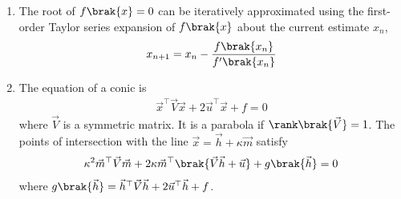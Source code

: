 \begin{enumerate}[label=\thesubsection.\arabic*, ref=\thesubsection.\theenumi]
\begin{align}
	x = \frac{-q \pm \sqrt{q^2 - 4pr}}{2p}
	\label{eq:EE26BTECH11229-quad-formula}
\end{align}
\item The root of $f\brak{x} = 0$ can be iteratively approximated using the first-order Taylor series expansion of $f\brak{x}$ about the current estimate $x_n$,
\begin{align}
	x_{n+1} = x_n - \frac{f\brak{x_n}}{f^{\prime}\brak{x_n}}
	\label{eq:EE26BTECH11229-newton10}
\end{align}
\item The equation of a conic is
\begin{align}
	\vec{x}^{\top}\vec{V}\vec{x} + 2\vec{u}^{\top}\vec{x} + f = 0
	\label{eq:EE26BTECH11229-conic}
\end{align}
where $\vec{V}$ is a symmetric matrix. It is a parabola if $\rank\brak{\vec{V}} = 1$. The points of intersection with the line $\vec{x} = \vec{h} + \kappa\vec{m}$ satisfy
\begin{align}
	\kappa^2\vec{m}^{\top}\vec{V}\vec{m} + 2\kappa\vec{m}^{\top}\brak{\vec{V}\vec{h} + \vec{u}} + g\brak{\vec{h}} = 0
	\label{eq:EE26BTECH11229-conic-line}
\end{align}
where $g\brak{\vec{h}} = \vec{h}^{\top}\vec{V}\vec{h} + 2\vec{u}^{\top}\vec{h} + f$.


\end{enumerate}
